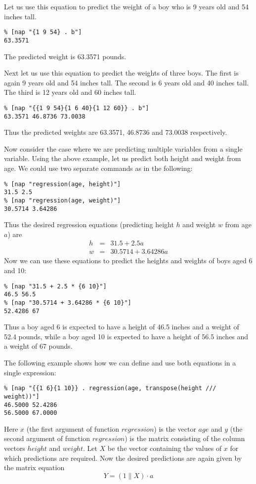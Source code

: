 Let us use this equation to predict the weight of a boy who is 9 years old and 54 inches tall.
\begin{verbatim}
% [nap "{1 9 54} . b"]
63.3571
\end{verbatim}
The predicted weight is 63.3571 pounds.

Next let us use this equation to predict the weights of three boys.
The first is again 9 years old and 54 inches tall.
The second is 6 years old and 40 inches tall.
The third is 12 years old and 60 inches tall.
\begin{verbatim}
% [nap "{{1 9 54}{1 6 40}{1 12 60}} . b"]
63.3571 46.8736 73.0038
\end{verbatim}
Thus the predicted weights are 
63.3571, 46.8736 and 73.0038 respectively.

Now consider the case where we are predicting multiple variables from a single variable.
Using the above example, let us predict both height and weight from age.
We could use two separate commands as in the following:
\begin{verbatim}
% [nap "regression(age, height)"]
31.5 2.5
% [nap "regression(age, weight)"]
30.5714 3.64286
\end{verbatim}
Thus the desired regression equations (predicting height $h$ and weight $w$ from age $a$) are
\begin{eqnarray*}
h & = & 31.5    + 2.5 a \\
w & = & 30.5714 + 3.64286 a
\end{eqnarray*}
Now we can use these equations to predict the heights and weights of boys aged 6 and 10:
\begin{verbatim}
% [nap "31.5 + 2.5 * {6 10}"]
46.5 56.5
% [nap "30.5714 + 3.64286 * {6 10}"]
52.4286 67
\end{verbatim}
Thus a boy aged 6 is expected to have a height of 46.5 inches and a weight of 52.4 pounds,
while a boy aged 10 is expected to have a height of 56.5 inches and a weight of 67 pounds.

The following example shows how we can define and use both equations in a single expression:
\begin{verbatim}
% [nap "{{1 6}{1 10}} . regression(age, transpose(height /// weight))"]
46.5000 52.4286
56.5000 67.0000
\end{verbatim}

Here $x$ 
(the first argument of function $\mathit{regression}$)
is the vector $\mathit{age}$ and $y$ 
(the second argument of function $\mathit{regression}$)
is the matrix consisting of the column vectors
$\mathit{height}$ and $\mathit{weight}$.
Let $X$ be the vector containing the values of $x$ for which predictions are required.
Now the desired predictions are again given by the matrix equation
\[ Y = (1 \| X) \cdot a \]

